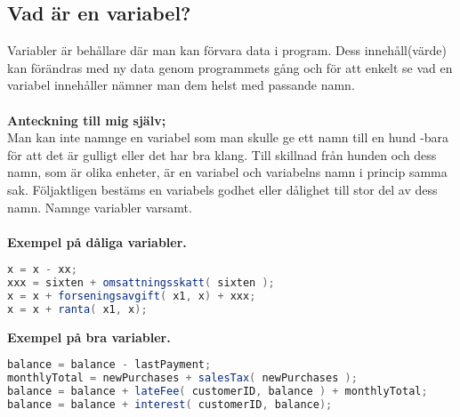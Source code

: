 \documentclass[../main.tex]{subfiles}
\begin{document}
\subsection{Vad är en variabel?} 

Variabler är behållare där man kan förvara data i program. Dess innehåll(värde) kan förändras med ny data genom programmets gång och för att enkelt se vad en variabel innehåller nämner man dem helst med passande namn.\\
\\
\textbf{Anteckning till mig själv;}\\
Man kan inte namnge en variabel som man skulle ge ett namn till en hund -bara för att det är gulligt eller det har bra klang. Till skillnad från hunden och dess namn, som är olika enheter, är en variabel och variabelns namn i princip samma sak. Följaktligen bestäms en variabels godhet eller dålighet till stor del av dess namn. Namnge variabler varsamt. \\
\\
\textbf{Exempel på dåliga variabler.}
\begin{lstlisting}[language=java]
x = x - xx;
xxx = sixten + omsattningsskatt( sixten );
x = x + forseningsavgift( x1, x) + xxx;
x = x + ranta( x1, x);
\end{lstlisting}
\textbf{Exempel på bra variabler.}
\begin{lstlisting}[language=java]
balance = balance - lastPayment;
monthlyTotal = newPurchases + salesTax( newPurchases );
balance = balance + lateFee( customerID, balance ) + monthlyTotal;
balance = balance + interest( customerID, balance);
\end{lstlisting}
\end{document}
